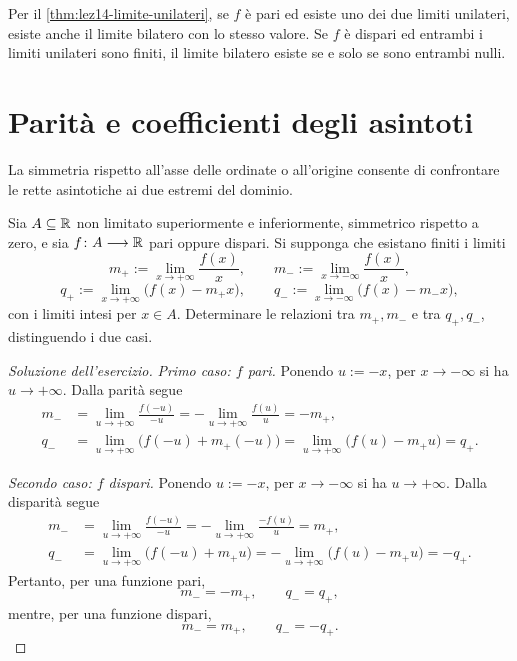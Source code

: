 Per il \cref{thm:lez14-limite-unilateri},
se \(f\) è pari ed esiste uno dei due limiti unilateri,
esiste anche il limite bilatero con lo stesso valore.
Se \(f\) è dispari ed entrambi i limiti unilateri sono
finiti, il limite bilatero esiste se e solo se sono
entrambi nulli.

\section{Parità e coefficienti degli asintoti}
\label{sec:lez19-parita-asintoti}

La simmetria rispetto all'asse delle ordinate o
all'origine consente di confrontare le rette
asintotiche ai due estremi del dominio.

\begin{exercise}
\label{ex:lez19-coefficienti-asintotici}
Sia \(A\subseteq\mathbb{R}\) non limitato superiormente e
inferiormente, simmetrico rispetto a zero, e sia
\(f\colon A\longrightarrow\mathbb{R}\) pari oppure dispari.
Si supponga che esistano finiti i limiti
\[
  m_+:=\lim_{x\to+\infty}\frac{f(x)}x,
  \qquad
  m_-:=\lim_{x\to-\infty}\frac{f(x)}x,
\]
\[
  q_+:=\lim_{x\to+\infty}\bigl(f(x)-m_+x\bigr),
  \qquad
  q_-:=\lim_{x\to-\infty}\bigl(f(x)-m_-x\bigr),
\]
con i limiti intesi per \(x\in A\).
Determinare le relazioni tra \(m_+,m_-\) e tra
\(q_+,q_-\), distinguendo i due casi.
\end{exercise}

\begin{proof}[Soluzione dell'esercizio]
\emph{Primo caso: \(f\) pari.}
Ponendo \(u:=-x\), per \(x\to-\infty\) si ha
\(u\to+\infty\). Dalla parità segue
\[
\begin{aligned}
  m_-
  &=\lim_{u\to+\infty}\frac{f(-u)}{-u}
   =-\lim_{u\to+\infty}\frac{f(u)}u
   =-m_+,\\
  q_-
  &=\lim_{u\to+\infty}\bigl(f(-u)+m_+(-u)\bigr)
   =\lim_{u\to+\infty}\bigl(f(u)-m_+u\bigr)
   =q_+.
\end{aligned}
\]

\emph{Secondo caso: \(f\) dispari.}
Ponendo \(u:=-x\), per \(x\to-\infty\) si ha
\(u\to+\infty\). Dalla disparità segue
\[
\begin{aligned}
  m_-
  &=\lim_{u\to+\infty}\frac{f(-u)}{-u}
   =-\lim_{u\to+\infty}\frac{-f(u)}u
   =m_+,\\
  q_-
  &=\lim_{u\to+\infty}\bigl(f(-u)+m_+u\bigr)
   =-\lim_{u\to+\infty}\bigl(f(u)-m_+u\bigr)
   =-q_+.
\end{aligned}
\]
Pertanto, per una funzione pari,
\[
  m_-=-m_+ ,\qquad q_-=q_+,
\]
mentre, per una funzione dispari,
\[
  m_-=m_+ ,\qquad q_-=-q_+.
\]
\end{proof}

